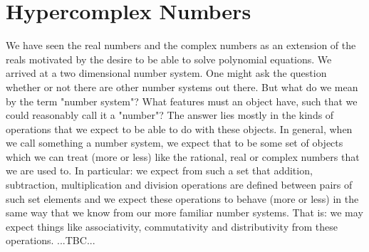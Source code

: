 \section{Hypercomplex Numbers}
We have seen the real numbers and the complex numbers as an extension of the reals motivated by the desire to be able to solve polynomial equations. We arrived at a two dimensional number system. One might ask the question whether or not there are other number systems out there. But what do we mean by the term "number system"? What features must an object have, such that we could reasonably call it a "number"? The answer lies mostly in the kinds of operations that we expect to be able to do with these objects. In general, when we call something a number system, we expect that to be some set of objects which we can treat (more or less) like the rational, real or complex numbers that we are used to. In particular: we expect from such a set that addition, subtraction, multiplication and division operations are defined between pairs of such set elements and we expect these operations to behave (more or less) in the same way that we know from our more familiar number systems. That is: we may expect things like associativity, commutativity and distributivity from these operations. ...TBC...



